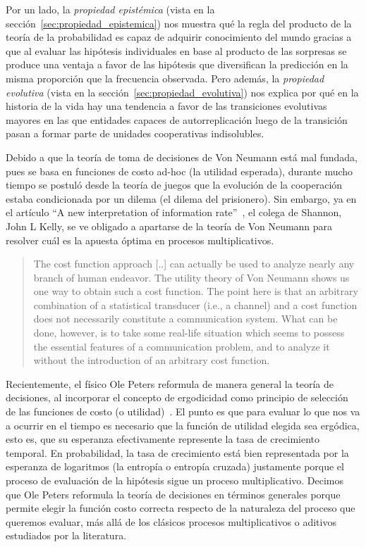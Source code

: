 \documentclass[a4paper,11pt]{book}
\theoremstyle{definition}
\begin{document}
%

Por un lado, la \emph{propiedad epist\'emica} (vista en la secci\'on~\ref{sec:propiedad_epistemica}) nos muestra qu\'e la regla del producto de la teor\'ia de la probabilidad es capaz de adquirir conocimiento del mundo gracias a que al evaluar las hip\'otesis individuales en base al producto de las sorpresas se produce una ventaja a favor de las hip\'otesis que diversifican la predicci\'on en la misma proporci\'on que la frecuencia observada.
%
Pero adem\'as, la \emph{propiedad evolutiva} (vista en la secci\'on~\ref{sec:propiedad_evolutiva}) nos explica por qu\'e en la historia de la vida hay una tendencia a favor de las transiciones evolutivas mayores en las que entidades capaces de autorreplicaci\'on luego de la transici\'on pasan a formar parte de unidades cooperativas indisolubles.


Debido a que la teor\'ia de toma de decisiones de Von Neumann est\'a mal fundada, pues se basa en funciones de costo ad-hoc (la utilidad esperada), durante mucho tiempo se postul\'o desde la teor\'ia de juegos que la evoluci\'on de la cooperaci\'on estaba condicionada por un dilema (el dilema del prisionero).
%
Sin embargo, ya en el art\'iculo ``A new interpretation of information rate''~\cite{kelly1956}, el colega de Shannon, John L Kelly, se ve obligado a apartarse de la teor\'ia de Von Neumann para resolver cu\'al es la apuesta \'optima en procesos multiplicativos.
%
\begin{quotation}
The cost function approach [..] can actually be used to analyze nearly any branch of human endeavor.
The utility theory of Von Neumann shows us one way to obtain such a cost function.
The point here is that an arbitrary combination of a statistical transducer (i.e., a channel) and a cost function does not necessarily constitute a communication system.
What can be done, however, is to take some real-life situation which seems to possess the essential features of a communication problem, and to analyze it without the introduction of an arbitrary cost function.
\end{quotation}
%
Recientemente, el f\'isico Ole Peters reformula de manera general la teor\'ia de decisiones, al incorporar el concepto de ergodicidad como principio de selecci\'on de las funciones de costo (o utilidad)~\cite{peters2019-ergodicityEconomics,peters2021-interpretation}.
%
El punto es que para evaluar lo que nos va a ocurrir en el tiempo es necesario que la funci\'on de utilidad elegida sea erg\'odica, esto es, que su esperanza efectivamente represente la tasa de crecimiento temporal.
%
En probabilidad, la tasa de crecimiento est\'a bien representada por la esperanza de logaritmos (la entrop\'ia o entrop\'ia cruzada) justamente porque el proceso de evaluaci\'on de la hip\'otesis sigue un proceso multiplicativo.
%
Decimos que Ole Peters reformula la teor\'ia de decisiones en t\'erminos generales porque permite elegir la funci\'on costo correcta respecto de la naturaleza del proceso que queremos evaluar, m\'as all\'a de los cl\'asicos procesos multiplicativos o aditivos estudiados por la literatura.
\end{document}
